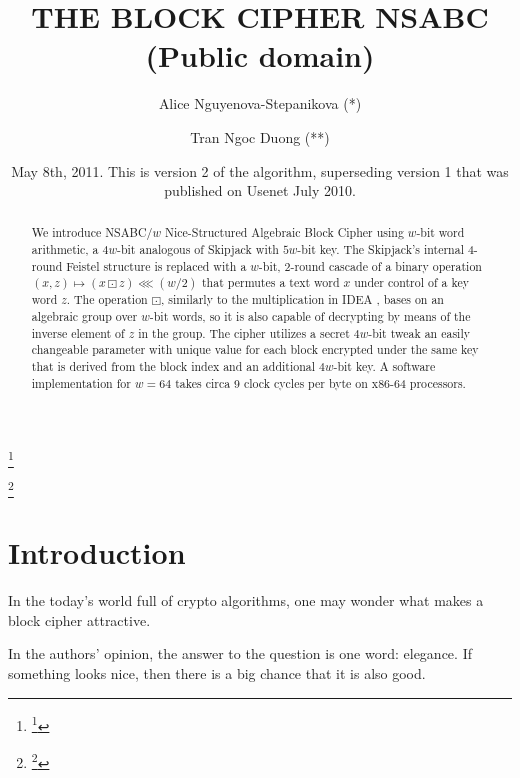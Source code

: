 \documentclass[a4paper,oneside,english]{amsart}
\numberwithin{equation}{section}
\numberwithin{figure}{section}
\begin{document}
\title{THE BLOCK CIPHER NSABC (Public domain)}


\author{Alice Nguyenova-Stepanikova ({*})}


\thanks{\thanks{({*}) Hradcany, Praha, Czech Republic}}


\author{Tran Ngoc Duong ({*}{*})}


\thanks{\thanks{({*}{*}) Pernink, Karlovy Vary, Czech Republic. E-mail: \texttt{tranngocduong@gmail.com}}}


\date{May 8th, 2011. This is version 2 of the algorithm, superseding version
1 that was published on Usenet July 2010.}
\begin{abstract}
We introduce NSABC/$w$ \textendash{} Nice-Structured Algebraic Block
Cipher using $w$-bit word arithmetic, a $4w$-bit analogous of Skipjack
\cite{NSA98} with $5w$-bit key. The Skipjack's internal 4-round
Feistel structure is replaced with a $w$-bit, 2-round cascade of
a binary operation $(x,z)\mapsto(x\boxdot z)\lll(w/2)$ that permutes
a text word $x$ under control of a key word $z$. The operation $\boxdot$,
similarly to the multiplication in IDEA \cite{LM91,LMM91}, bases
on an algebraic group over $w$-bit words, so it is also capable of
decrypting by means of the inverse element of $z$ in the group. The
cipher utilizes a secret $4w$-bit tweak \textendash{} an easily changeable
parameter with unique value for each block encrypted under the same
key \cite{LRW02} \textendash{} that is derived from the block index
and an additional $4w$-bit key. A software implementation for $w=64$
takes circa 9 clock cycles per byte on x86-64 processors.
\end{abstract}


\maketitle

\section{Introduction}

In the today's world full of crypto algorithms, one may wonder what
makes a block cipher attractive.

In the authors' opinion, the answer to the question is one word: elegance.
If something looks nice, then there is a big chance that it is also
good.
\end{document}

